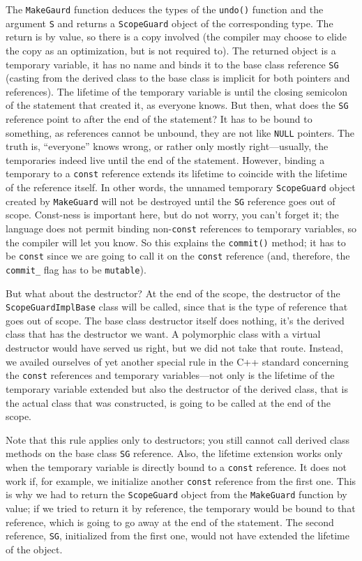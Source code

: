 The \texttt{MakeGaurd} function deduces the types of the \texttt{undo()} function and the argument \texttt{S} and returns a \texttt{ScopeGuard} object of the corresponding type. The return is by value, so there is a copy involved (the compiler may choose to elide the copy as an optimization, but is not required to). The returned object is a temporary variable, it has no name and binds it to the base class reference \texttt{SG} (casting from the derived class to the base class is implicit for both pointers and references). The lifetime of the temporary variable is until the closing semicolon of the statement that created it, as everyone knows. But then, what does the \texttt{SG} reference point to after the end of the statement? It has to be bound to something, as references cannot be unbound, they are not like \texttt{NULL} pointers. The truth is, ``everyone'' knows wrong, or rather only mostly right---usually, the temporaries indeed live until the end of the statement. However, binding a temporary to a \texttt{const} reference extends its lifetime to coincide with the lifetime of the reference itself. In other words, the unnamed temporary \texttt{ScopeGuard} object created by \texttt{MakeGuard} will not be destroyed until the \texttt{SG} reference goes out of scope. Const-ness is important here, but do not worry, you can't forget it; the language does not permit binding non-\texttt{const} references to temporary variables, so the compiler will let you know. So this explains the \texttt{commit()} method; it has to be \texttt{const} since we are going to call it on the \texttt{const} reference (and, therefore, the \texttt{commit\_} flag has to be \texttt{mutable}).

But what about the destructor? At the end of the scope, the destructor of the \texttt{ScopeGuardImplBase} class will be called, since that is the type of reference that goes out of scope. The base class destructor itself does nothing, it's the derived class that has the destructor we want. A polymorphic class with a virtual destructor would have served us right, but we did not take that route. Instead, we availed ourselves of yet another special rule in the C++ standard concerning the \texttt{const} references and temporary variables---not only is the lifetime of the temporary variable extended but also the destructor of the derived class, that is the actual class that was constructed, is going to be called at the end of the scope.

Note that this rule applies only to destructors; you still cannot call derived class methods on the base class \texttt{SG} reference. Also, the lifetime extension works only when the temporary variable is directly bound to a \texttt{const} reference. It does not work if, for example, we initialize another \texttt{const} reference from the first one. This is why we had to return the \texttt{ScopeGuard} object from the \texttt{MakeGuard} function by value; if we tried to return it by reference, the temporary would be bound to that reference, which is going to go away at the end of the statement. The second reference, \texttt{SG}, initialized from the first one, would not have extended the lifetime of the object.

